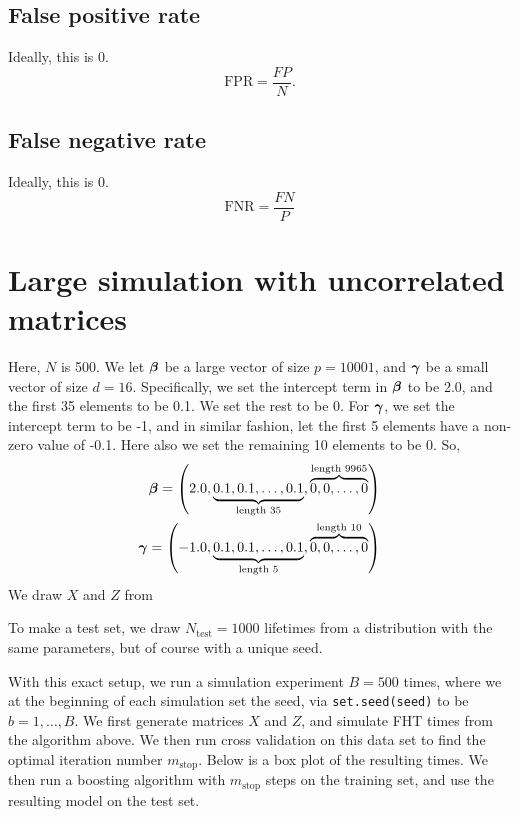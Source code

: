 \subsection{False positive rate}
Ideally, this is 0.
\begin{equation}\label{eq:sensitivity}
    \text{FPR}=\frac{FP}{N}.
\end{equation}

\subsection{False negative rate}
Ideally, this is 0.
\begin{equation}\label{eq:sensitivity}
    \text{FNR}=\frac{FN}{P}
\end{equation}

\section{Large simulation with uncorrelated matrices}
Here, $N$ is 500. We let $\boldsymbol{\beta}$ be a large vector of size $p=10001$, and $\boldsymbol{\gamma}$ be a small vector of size $d=16$. Specifically, we set the intercept term in $\boldsymbol{\beta}$ to be 2.0, and the first 35 elements to be 0.1. We set the rest to be 0. For $\boldsymbol{\gamma}$, we set the intercept term to be -1, and in similar fashion, let the first 5 elements have a non-zero value of -0.1. Here also we set the remaining 10 elements to be 0. So,
\begin{align*}
    \boldsymbol{\beta}=\left(2.0, \underbrace{0.1, 0.1, \ldots, 0.1}_{\text{length 35}}, \overbrace{0, 0, \ldots, 0}^{\text{length 9965}}\right) \\
    \boldsymbol{\gamma}=\left(-1.0, \underbrace{0.1, 0.1, \ldots, 0.1}_{\text{length 5}}, \overbrace{0, 0, \ldots, 0}^{\text{length 10}}\right)
\end{align*}
We draw $X$ and $Z$ from 

To make a test set, we draw $N_{\text{test}}=1000$ lifetimes from a distribution with the same parameters, but of course with a unique seed.

With this exact setup, we run a simulation experiment $B=500$ times, where we at the beginning of each simulation set the seed, via \verb|set.seed(seed)| to be $b=1,\ldots,B$. We first generate matrices $X$ and $Z$, and simulate FHT times from the algorithm above. We then run cross validation on this data set to find the optimal iteration number $m_{\text{stop}}$. Below is a box plot of the resulting times. We then run a boosting algorithm with $m_{\text{stop}}$ steps on the training set, and use the resulting model on the test set.

